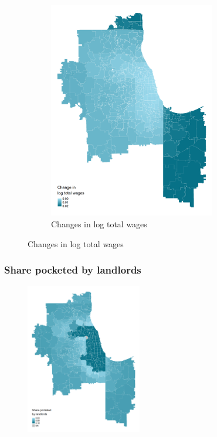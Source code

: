 \documentclass[aspectratio=169, t]{beamer}
\begin{document}
\begin{frame}
\begin{figure}
\begin{subfigure}{0.5\textwidth}
            \includegraphics[width = 0.8\textwidth]{counterfactuals/output/chicago_d_ln_wagebill.png}
            \caption*{Changes in log total wages}
        \end{subfigure}
    \end{figure}
\end{frame}

\begin{frame}
    \frametitle{Share pocketed by landlords}

    \vspace{-3mm}

    \begin{figure}
        \centering
        \includegraphics[width = 0.45\textwidth]{counterfactuals/output/chicago_rho.png}
    \end{figure}
\end{frame}
\end{document}
